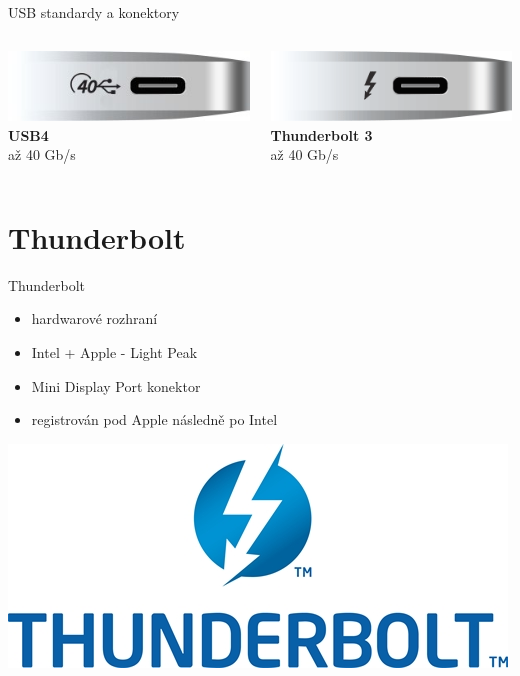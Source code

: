 \documentclass[aspectratio=43]{beamer}
\begin{document}
\begin{frame}{USB standardy a konektory}
	\vspace{0.5cm}
	
	\begin{columns}[t]
		\begin{column}{0.5\textwidth}
			\includegraphics[width=0.6\linewidth]{extrahovane_obrazky/img_3_page22_4.jpeg}\\
			\centering\textbf{USB4}\\
			až 40 Gb/s
		\end{column}
		\begin{column}{0.5\textwidth}
			\includegraphics[width=0.6\linewidth]{extrahovane_obrazky/img_3_page22_5.png}\\
			\centering\textbf{Thunderbolt 3}\\
			až 40 Gb/s
		\end{column}
	\end{columns}
\end{frame}

\section{Thunderbolt}
\begin{frame}{Thunderbolt}
	\begin{itemize}
		\item hardwarové rozhraní
		\item Intel + Apple - Light Peak
		\item Mini Display Port konektor
		\item registrován pod Apple následně po Intel
	\end{itemize}
	\begin{center}
		\includegraphics[width=0.8\linewidth]{extrahovane_obrazky/img_4_page1_0.jpeg}
	\end{center}
	
\end{frame}
\end{document}
